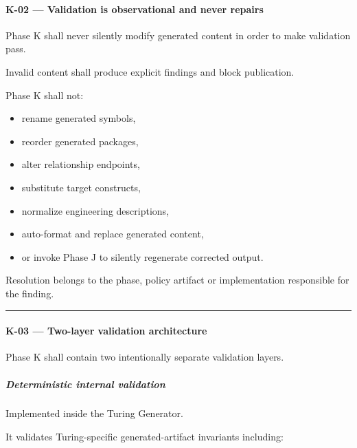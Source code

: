\hypertarget{k-02--validation-is-observational-and-never-repairs}{%
\paragraph{K-02 --- Validation is observational and never repairs}\label{k-02--validation-is-observational-and-never-repairs}}

Phase K shall never silently modify generated content in order to make validation pass.

Invalid content shall produce explicit findings and block publication.

Phase K shall not:

\begin{itemize}
\tightlist
\item
  rename generated symbols,
\item
  reorder generated packages,
\item
  alter relationship endpoints,
\item
  substitute target constructs,
\item
  normalize engineering descriptions,
\item
  auto-format and replace generated content,
\item
  or invoke Phase J to silently regenerate corrected output.
\end{itemize}

Resolution belongs to the phase, policy artifact or implementation responsible for the finding.

\begin{center}\rule{0.5\linewidth}{0.5pt}\end{center}

\hypertarget{k-03--two-layer-validation-architecture}{%
\paragraph{K-03 --- Two-layer validation architecture}\label{k-03--two-layer-validation-architecture}}

Phase K shall contain two intentionally separate validation layers.

\hypertarget{deterministic-internal-validation}{%
\subparagraph{Deterministic internal validation}\label{deterministic-internal-validation}}

Implemented inside the Turing Generator.

It validates Turing-specific generated-artifact invariants including:

